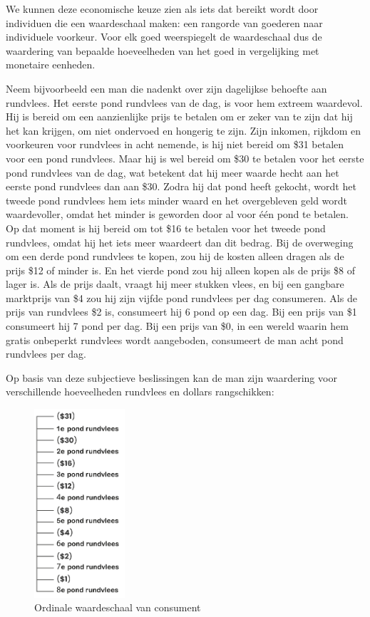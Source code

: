 We kunnen deze economische keuze zien als iets dat bereikt wordt door individuen die een waardeschaal maken: een rangorde van goederen naar individuele voorkeur. Voor elk goed weerspiegelt de waardeschaal dus de waardering van bepaalde hoeveelheden van het goed in vergelijking met monetaire eenheden.

Neem bijvoorbeeld een man die nadenkt over zijn dagelijkse behoefte aan rundvlees. Het eerste pond rundvlees van de dag, is voor hem extreem waardevol. Hij is bereid om een aanzienlijke prijs te betalen om er zeker van te zijn dat hij het kan krijgen, om niet ondervoed en hongerig te zijn. Zijn inkomen, rijkdom en voorkeuren voor rundvlees in acht nemende, is hij niet bereid om \$31 betalen voor een pond rundvlees. Maar hij is wel bereid om \$30 te betalen voor het eerste pond rundvlees van de dag, wat betekent dat hij meer waarde hecht aan het eerste pond rundvlees dan aan \$30. Zodra hij dat pond heeft gekocht, wordt het tweede pond rundvlees hem iets minder waard en het overgebleven geld wordt waardevoller, omdat het minder is geworden door al voor één pond te betalen. Op dat moment is hij bereid om tot \$16 te betalen voor het tweede pond rundvlees, omdat hij het iets meer waardeert dan dit bedrag. Bij de overweging om een derde pond rundvlees te kopen, zou hij de kosten alleen dragen als de prijs \$12 of minder is. En het vierde pond zou hij alleen kopen als de prijs \$8 of lager is. Als de prijs daalt, vraagt hij meer stukken vlees, en bij een gangbare marktprijs van \$4 zou hij zijn vijfde pond rundvlees per dag consumeren. Als de prijs van rundvlees \$2 is, consumeert hij 6 pond op een dag. Bij een prijs van \$1 consumeert hij 7 pond per dag. Bij een prijs van \$0, in een wereld waarin hem gratis onbeperkt rundvlees wordt aangeboden, consumeert de man acht pond rundvlees per dag.

Op basis van deze subjectieve beslissingen kan de man zijn waardering voor verschillende hoeveelheden rundvlees en dollars rangschikken:

\begin{figure}[H]
\centering
    \includegraphics[height=7cm]{figures/fig20-1.png}
    \caption[Ordinale waardeschaal van consument]{Ordinale waardeschaal van consument}
    \label{fig19}
\end{figure}

